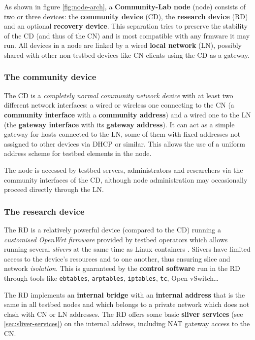 \documentclass[conference]{IEEEtran}
\begin{document}
As shown in figure \ref{fig:node-arch}, a \textbf{Community-Lab node} (node)
consists of two or three devices: the \textbf{community device} (CD), the
\textbf{research device} (RD) and an optional \textbf{recovery device}.  This
separation tries to preserve the stability of the CD (and thus of the CN) and
is most compatible with any frmware it may run.  All devices in a node are
linked by a wired \textbf{local network} (LN), possibly shared with other
non-testbed devices like CN clients using the CD as a gateway.

\subsubsection{The community device}

The CD is a \emph{completely normal community network device} with at least
two different network interfaces: a wired or wireless one connecting to the CN
(a \textbf{community interface} with a \textbf{community address}) and a wired
one to the LN (the \textbf{gateway interface} with its \textbf{gateway
  address}).  It can act as a simple gateway for hosts connected to the LN,
some of them with fixed addresses not assigned to other devices via DHCP or
similar.  This allows the use of a uniform address scheme for testbed elements
in the node.

The node is accessed by testbed servers, administrators and researchers via
the community interfaces of the CD, although node administration may
occasionally proceed directly through the LN.

\subsubsection{The research device}

The RD is a relatively powerful device (compared to the CD) running a
\emph{customised OpenWrt firmware} provided by testbed operators which allows running
several \emph{slivers} at the same time as Linux containers \cite{lxc}.
Slivers have limited access to the device's resources and to one another, thus
ensuring slice and network \emph{isolation}.  This is guaranteed by the
\textbf{control software} run in the RD through tools like \texttt{ebtables},
\texttt{arptables}, \texttt{iptables}, \texttt{tc}, Open vSwitch…


The RD implements an \textbf{internal bridge} with an \textbf{internal
  address} that is the same in all testbed nodes and which belongs to a
private network which does not clash with CN or LN addresses.  The RD offers
some basic \textbf{sliver services} (see \ref{sec:sliver-services}) on the
internal address, including NAT gateway access to the CN.
\end{document}
